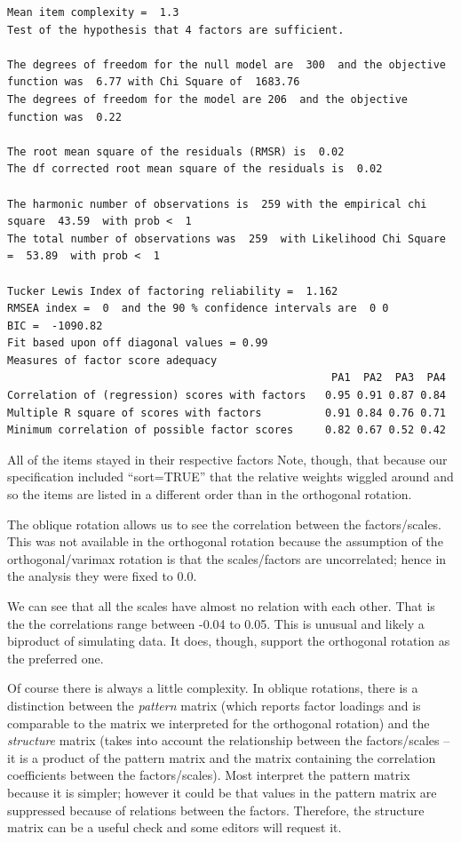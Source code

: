 \documentclass[
  english,
]{book}
\begin{document}
\begin{verbatim}
Mean item complexity =  1.3
Test of the hypothesis that 4 factors are sufficient.

The degrees of freedom for the null model are  300  and the objective function was  6.77 with Chi Square of  1683.76
The degrees of freedom for the model are 206  and the objective function was  0.22 

The root mean square of the residuals (RMSR) is  0.02 
The df corrected root mean square of the residuals is  0.02 

The harmonic number of observations is  259 with the empirical chi square  43.59  with prob <  1 
The total number of observations was  259  with Likelihood Chi Square =  53.89  with prob <  1 

Tucker Lewis Index of factoring reliability =  1.162
RMSEA index =  0  and the 90 % confidence intervals are  0 0
BIC =  -1090.82
Fit based upon off diagonal values = 0.99
Measures of factor score adequacy             
                                                   PA1  PA2  PA3  PA4
Correlation of (regression) scores with factors   0.95 0.91 0.87 0.84
Multiple R square of scores with factors          0.91 0.84 0.76 0.71
Minimum correlation of possible factor scores     0.82 0.67 0.52 0.42
\end{verbatim}

All of the items stayed in their respective factors Note, though, that because our specification included ``sort=TRUE'' that the relative weights wiggled around and so the items are listed in a different order than in the orthogonal rotation.

The oblique rotation allows us to see the correlation between the factors/scales. This was not available in the orthogonal rotation because the assumption of the orthogonal/varimax rotation is that the scales/factors are uncorrelated; hence in the analysis they were fixed to 0.0.

We can see that all the scales have almost no relation with each other. That is the the correlations range between -0.04 to 0.05. This is unusual and likely a biproduct of simulating data. It does, though, support the orthogonal rotation as the preferred one.

Of course there is always a little complexity. In oblique rotations, there is a distinction between the \emph{pattern} matrix (which reports factor loadings and is comparable to the matrix we interpreted for the orthogonal rotation) and the \emph{structure} matrix (takes into account the relationship between the factors/scales -- it is a product of the pattern matrix and the matrix containing the correlation coefficients between the factors/scales). Most interpret the pattern matrix because it is simpler; however it could be that values in the pattern matrix are suppressed because of relations between the factors. Therefore, the structure matrix can be a useful check and some editors will request it.
\end{document}
